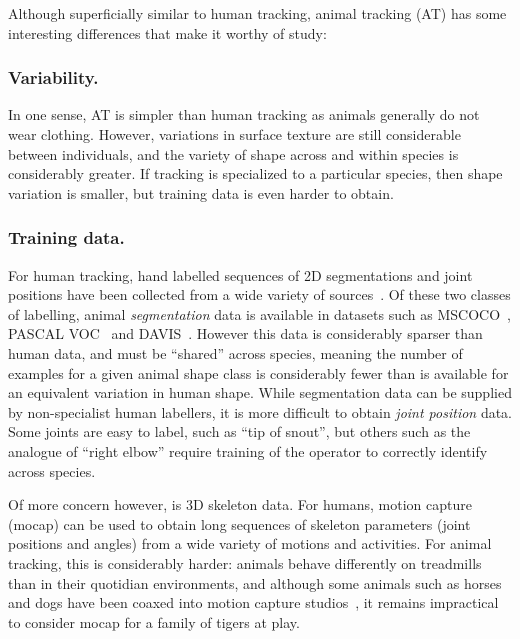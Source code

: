   Although superficially similar to human tracking, animal tracking (AT) has some interesting differences that make it worthy of study:
  
  \subsubsection*{Variability.}
  In one sense, AT is simpler than human tracking as animals generally do not wear clothing. However, variations in surface texture are still considerable between individuals, and the variety of shape across and within species is considerably greater.  If tracking is specialized to a particular species, then shape variation is smaller, but training data is even harder to obtain.
  
  \subsubsection*{Training data.}
  For human tracking, hand labelled sequences of 2D segmentations and joint positions have been collected from a wide variety of sources~\cite{andriluka14cvpr,mscoco,johnson2010clustered}. Of these two classes of labelling, animal {\em segmentation} data is available in datasets such as MSCOCO~\cite{mscoco}, PASCAL VOC~\cite{pascal-voc-2012} and DAVIS~\cite{Perazzi2016}.  However this data is considerably sparser than human data, and must be ``shared'' across species, meaning the number of examples for a given animal shape class is considerably fewer than is available for an equivalent variation in human shape.  While segmentation data can be supplied by non-specialist human labellers, it is more difficult to obtain {\em joint position} data.  Some joints are easy to label, such as ``tip of snout'', but others such as the analogue of ``right elbow'' require training of the operator to correctly identify across species.
  
  Of more concern however, is 3D skeleton data.  For humans, motion capture (mocap) can be used to obtain long sequences of skeleton parameters (joint positions and angles) from a wide variety of motions and activities.
  For animal tracking, this is considerably harder: animals behave differently on treadmills than in their quotidian environments, and although some animals such as horses and dogs have been coaxed into motion capture studios~\cite{wilhelm2015furyexplorer}, it remains impractical to consider mocap for a family of tigers at play.
  
